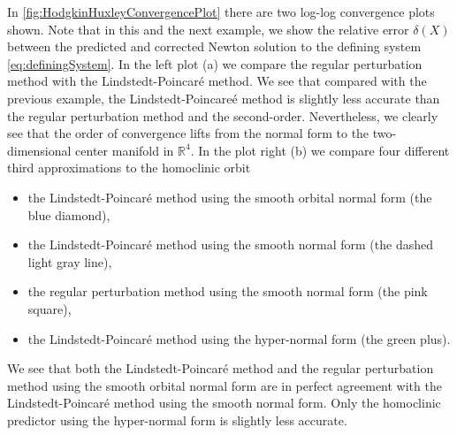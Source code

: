 In \cref{fig:HodgkinHuxleyConvergencePlot} there are two log-log convergence
plots shown. Note that in this and the next example, we show the relative error
$\delta(X)$ between the predicted and corrected Newton solution to the defining
system \cref{eq:definingSystem}.  In the left plot (a) we compare the regular
perturbation method with the Lindstedt-Poincar\'e method. We see that compared
with the previous example, the Lindstedt-Poincare\'e method is slightly less
accurate than the regular perturbation method and the second-order.
Nevertheless, we clearly see that the order of convergence lifts from the
normal form to the two-dimensional center manifold in $\mathbb R^4$. In the
plot right (b) we compare four different third approximations to the homoclinic
orbit
\begin{itemize}
    \item the Lindstedt-Poincar\'e method using the smooth orbital normal form
        (the blue diamond),
    \item the Lindstedt-Poincar\'e method using the smooth normal form
        (the dashed light gray line),
    \item the regular perturbation method using the smooth normal form
        (the pink square), 
    \item the Lindstedt-Poincar\'e method using the hyper-normal form
        (the green plus).
\end{itemize}

We see that both the Lindstedt-Poincar\'e method and the regular perturbation
method using the smooth orbital normal form are in perfect agreement with the
Lindstedt-Poincar\'e method using the smooth normal form. Only the homoclinic
predictor using the hyper-normal form is slightly less accurate.

